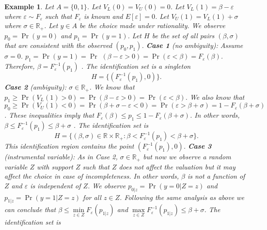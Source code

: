 \documentclass{article}
\newtheorem{example}{Example}
\begin{document}
\begin{example}
Let $A=\{0,1\}$. Let $V_{L}(0)=V_{U}(0)=0$. Let $V_{L}(1)=\beta -\varepsilon 
$ where $\varepsilon \sim F_{\varepsilon }$ such that $F_{\varepsilon }$ is
known and $E[\varepsilon ]=0$. Let $V_{U}(1)=V_{L}(1)+\sigma $ where $\sigma
\in 
\mathbb{R}
_{+}$. Let $y\in A$ be the choice made under rationality. We observe $%
p_{0}=\Pr (y=0)$ and $p_{1}=\Pr (y=1)$. Let $H$ be the set of all pairs $%
(\beta ,\sigma )$ that are consistent with the observed $(p_{0},p_{1})$. 
\newline
\relax\textbf{Case 1} (no ambiguity): Assume $\sigma =0$. $p_{1}=\Pr
(y=1)=\Pr $ $(\beta -\varepsilon >0)=\Pr (\varepsilon <\beta
)=F_{\varepsilon }(\beta )$. Therefore, $\beta =F_{\varepsilon }^{-1}(p_{1})$%
. The identification set is a singleton 
\begin{equation*}
H=\{(F_{\varepsilon }^{-1}(p_{1}),0)\}\text{.}
\end{equation*}%
\newline
\relax\textbf{Case 2} (ambiguity): $\sigma \in 
\mathbb{R}
_{+}$. We know that $p_{1}\geq \Pr (V_{L}(1)>0)=\Pr (\beta -\varepsilon
>0)=\Pr (\varepsilon <\beta )$. We also know that $p_{0}\geq \Pr
(V_{U}(1)<0)=\Pr (\beta +\sigma -\varepsilon <0)=\Pr (\varepsilon >\beta
+\sigma )=1-F_{\varepsilon }(\beta +\sigma )$. These inequalities imply that 
$F_{\varepsilon }(\beta )\leq p_{1}\leq 1-F_{\varepsilon }(\beta +\sigma )$.
In other words, $\beta \leq F_{\varepsilon }^{-1}(p_{1})\leq \beta +\sigma $%
. The identification set is 
\begin{equation*}
H=\{(\beta ,\sigma )\in 
\mathbb{R}
\times 
\mathbb{R}
_{+}:\beta <F_{\varepsilon }^{-1}(p_{1})<\beta +\sigma \}\text{.}
\end{equation*}%
This identification region contains the point $(F_{\varepsilon
}^{-1}(p_{1}),0)$. \newline
\relax\textbf{Case 3} (instrumental variable): As in Case 2, $\sigma \in \mathbb{R}_{+}$ but now we observe a random variable $Z$ with support $Z$ such that $Z$ does not affect the valuation but it may affect the choice in case of incompleteness. In other words, $\beta $ is not a function of $Z$ and $\varepsilon$ is independent of $Z$. We observe $p_{0|z}=\Pr (y=0|Z=z)$ and $p_{1|z}=\Pr (y=1|Z=z)$ for all $z\in Z$. Following the same analysis as above we can conclude that $\beta \leq \underset{z\in Z}{\min } F_{\varepsilon }(p_{1|z})$ and $\underset{z\in Z}{\max }F_{\varepsilon}^{-1}(p_{1|z})\leq \beta +\sigma $. The identification set is


\end{example}
\end{document}
